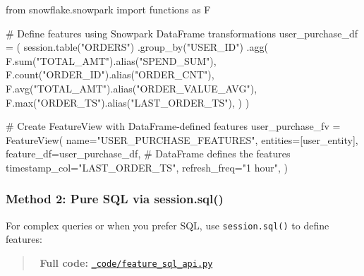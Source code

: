 \documentclass[
  letterpaper,
  DIV=11,
  numbers=noendperiod]{scrreprt}
\newenvironment{Shaded}{\begin{snugshade}}{\end{snugshade}}
\newcommand{\BuiltInTok}[1]{\textcolor[rgb]{0.00,0.23,0.31}{#1}}
\newcommand{\CommentTok}[1]{\textcolor[rgb]{0.37,0.37,0.37}{#1}}
\newcommand{\ImportTok}[1]{\textcolor[rgb]{0.00,0.46,0.62}{#1}}
\newcommand{\NormalTok}[1]{\textcolor[rgb]{0.00,0.23,0.31}{#1}}
\newcommand{\OperatorTok}[1]{\textcolor[rgb]{0.37,0.37,0.37}{#1}}
\newcommand{\StringTok}[1]{\textcolor[rgb]{0.13,0.47,0.30}{#1}}
\begin{document}
\begin{Shaded}
\begin{Highlighting}[]
\ImportTok{from}\NormalTok{ snowflake.snowpark }\ImportTok{import}\NormalTok{ functions }\ImportTok{as}\NormalTok{ F}

\CommentTok{\# Define features using Snowpark DataFrame transformations}
\NormalTok{user\_purchase\_df }\OperatorTok{=}\NormalTok{ (}
\NormalTok{    session.table(}\StringTok{"ORDERS"}\NormalTok{)}
\NormalTok{    .group\_by(}\StringTok{"USER\_ID"}\NormalTok{)}
\NormalTok{    .agg(}
\NormalTok{        F.}\BuiltInTok{sum}\NormalTok{(}\StringTok{"TOTAL\_AMT"}\NormalTok{).alias(}\StringTok{"SPEND\_SUM"}\NormalTok{),}
\NormalTok{        F.count(}\StringTok{"ORDER\_ID"}\NormalTok{).alias(}\StringTok{"ORDER\_CNT"}\NormalTok{),}
\NormalTok{        F.avg(}\StringTok{"TOTAL\_AMT"}\NormalTok{).alias(}\StringTok{"ORDER\_VALUE\_AVG"}\NormalTok{),}
\NormalTok{        F.}\BuiltInTok{max}\NormalTok{(}\StringTok{"ORDER\_TS"}\NormalTok{).alias(}\StringTok{"LAST\_ORDER\_TS"}\NormalTok{),}
\NormalTok{    )}
\NormalTok{)}

\CommentTok{\# Create FeatureView with DataFrame{-}defined features}
\NormalTok{user\_purchase\_fv }\OperatorTok{=}\NormalTok{ FeatureView(}
\NormalTok{    name}\OperatorTok{=}\StringTok{"USER\_PURCHASE\_FEATURES"}\NormalTok{,}
\NormalTok{    entities}\OperatorTok{=}\NormalTok{[user\_entity],}
\NormalTok{    feature\_df}\OperatorTok{=}\NormalTok{user\_purchase\_df,  }\CommentTok{\# DataFrame defines the features}
\NormalTok{    timestamp\_col}\OperatorTok{=}\StringTok{"LAST\_ORDER\_TS"}\NormalTok{,}
\NormalTok{    refresh\_freq}\OperatorTok{=}\StringTok{"1 hour"}\NormalTok{,}
\NormalTok{)}
\end{Highlighting}
\end{Shaded}

\hypertarget{method-2-pure-sql-via-session.sql}{%
\subsubsection{Method 2: Pure SQL via
session.sql()}\label{method-2-pure-sql-via-session.sql}}

For complex queries or when you prefer SQL, use \texttt{session.sql()}
to define features:

\begin{quote}
📁 \textbf{Full code:}
\href{_code/feature_sql_api.py}{\texttt{\_code/feature\_sql\_api.py}}
\end{quote}
\end{document}
